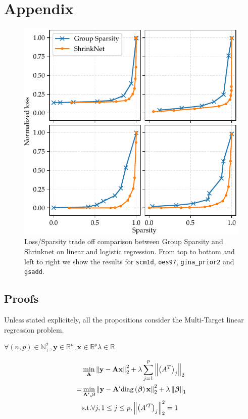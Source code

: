 \section{Appendix}

\begin{figure}[t]
\begin{center}
\includegraphics[width=.7\columnwidth]{regressions}
\vspace*{-5mm}
\caption{\label{sparsity_accuracy}Loss/Sparsity trade off comparison between Group Sparsity and Shrinknet on linear and logistic regression. From top to bottom and left to right we show the results for \texttt{scm1d}, \texttt{oes97}, \texttt{gina\_prior2} and \texttt{gsadd}.}

\end{center}
\vspace*{-4mm}
\end{figure}

\subsection{Proofs}
Unless stated explicitely, all the propositions consider the Multi-Target linear regression problem.
\begin{proposition}
\label{gps_equivalence}
  $\forall (n, p) \in \mathbb{N}_+^2, \bm{y} \in \mathbb{R}^{n}, \bm{x} \in \mathbb{R}^{p} \lambda \in \mathbb{R}$
  
  \begin{align*}
    & \min_{\bf{A}} \left\lVert\bf{y} - \bf{A}\bf{x}\right\rVert_2^2 + \lambda \sum_{j=1}^p \left\lVert\left(A^T\right)_j\right\rVert_2 \\
     = &\min_{\bf{A'}, \bm{\beta}} \left\lVert\bf{y} - \bf{A'}\text{diag}\left(\bm{\beta}\right)\bf{x}\right\rVert_2^2 + \lambda \left\lVert\bm{\beta}\right\rVert_1 \\
     & \text{s.t.} \forall j, 1 \leq j \leq p, \left\lVert\left(A'^T\right)_j\right\rVert_2^2 = 1
  \end{align*}
\end{proposition}

